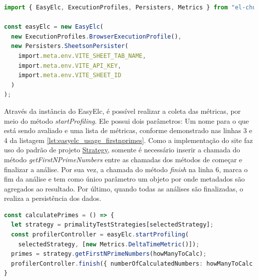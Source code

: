 \documentclass[12pt]{tcc}
\begin{document}
	\begin{minipage}{\linewidth}


	\begin{lstlisting}[label={lst:easyelc_setup}, caption={[Instância do módulo EasyELC no exemplo dos números primos.]Instância do módulo EasyElc no site Calculadora dos Primeiros n Números Primos.}, language=TypeScript, breaklines=true]
import { EasyElc, ExecutionProfiles, Persisters, Metrics } from "el-chupacabra"

const easyElc = new EasyElc(
  new ExecutionProfiles.BrowserExecutionProfile(),
  new Persisters.SheetsonPersister(
    import.meta.env.VITE_SHEET_TAB_NAME,
    import.meta.env.VITE_API_KEY,
    import.meta.env.VITE_SHEET_ID
  )
);
	\end{lstlisting}

	\end{minipage}

	Através da instância do EasyElc, é possível realizar a coleta das métricas, por meio do método \emph{startProfiling}.
	Ele possui dois parâmetros: Um nome para o que está sendo avaliado e uma lista de métricas, conforme demonstrado nas linhas 3 e 4 da listagem \ref{lst:easyelc_usage_firstnprimes}.
	Como a implementação do site faz uso do padrão de projeto \hyperref[subsection:strategy]{Strategy}, somente é necessário inserir a chamada do método \emph{getFirstNPrimeNumbers} entre as chamadas dos métodos de começar e finalizar a análise.
	Por sua vez, a chamada do método \emph{finish} na linha 6, marca o fim da análise e tem como único parâmetro um objeto por onde metadados são agregados ao resultado.
	Por último, quando todas as análises são finalizadas, o  realiza a persistência dos dados.

\begin{minipage}{\linewidth}
\begin{lstlisting}[label={lst:easyelc_usage_firstnprimes}, caption={[Coleta de métricas no exemplo dos números primos]Coleta de métricas usando o EasyElc no site Calculadora dos Primeiros n Números Primos.}, language=TypeScript, breaklines=true]
const calculatePrimes = () => {
  let strategy = primalityTestStrategies[selectedStrategy];
  const profilerController = easyElc.startProfiling(
    selectedStrategy, [new Metrics.DeltaTimeMetric()]);
  primes = strategy.getFirstNPrimeNumbers(howManyToCalc);
  profilerController.finish({ numberOfCalculatedNumbers: howManyToCalc });
}
\end{lstlisting}
\end{minipage}
\end{document}

